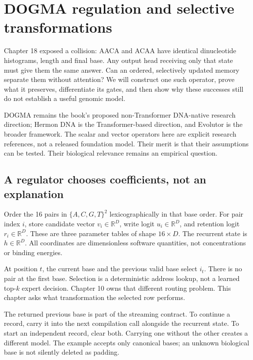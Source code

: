 \chapter{DOGMA regulation and selective transformations}
Chapter 18 exposed a collision: AACA and ACAA have identical dinucleotide
histograms, length and final base. Any output head receiving only that state
must give them the same answer. Can an ordered, selectively updated memory
separate them without attention? We will construct one such operator, prove
what it preserves, differentiate its gates, and then show why these successes
still do not establish a useful genomic model.

DOGMA remains the book's proposed non-Transformer DNA-native research direction;
Hermon DNA is the Transformer-based direction, and Evolutor is the broader
framework. The scalar and vector operators here are explicit research references,
not a released foundation model. Their merit is that their assumptions can be
tested. Their biological relevance remains an empirical question.

\section{A regulator chooses coefficients, not an explanation}
Order the 16 pairs in $\{A,C,G,T\}^2$ lexicographically in that base order.
For pair index $i$, store candidate vector $v_i\in\mathbb R^D$, write logit
$u_i\in\mathbb R^D$, and retention logit $r_i\in\mathbb R^D$. These are three
parameter tables of shape $16\times D$. The recurrent state is
$h\in\mathbb R^D$. All coordinates are dimensionless software quantities,
not concentrations or binding energies.

At position $t$, the current base and the previous valid base select $i_t$.
There is no pair at the first base. Selection is a deterministic address lookup,
not a learned top-$k$ expert decision. Chapter 10 owns that different routing
problem. This chapter asks what transformation the selected row performs.

The returned previous base is part of the streaming contract. To continue a
record, carry it into the next compilation call alongside the recurrent state.
To start an independent record, clear both. Carrying one without the other
creates a different model. The example accepts only canonical bases; an unknown
biological base is not silently deleted as padding.

